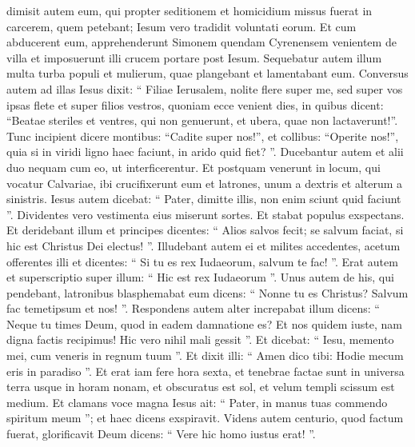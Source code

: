 \begin{biblechapter}
\begin{biblechapter}
\begin{biblechapter}
\begin{biblechapter}
\begin{biblechapter}
\begin{biblechapter}
\begin{biblechapter}
\begin{biblechapter}
\begin{biblechapter}
\begin{biblechapter}
\begin{biblechapter}
\begin{biblechapter}
\begin{biblechapter}
\begin{biblechapter}
\begin{biblechapter}
\begin{biblechapter}
\begin{biblechapter}
\begin{biblechapter}
\begin{biblechapter}
\begin{biblechapter}
\begin{biblechapter}
\begin{biblechapter}
\begin{biblechapter}
\verse dimisit autem eum, qui propter seditionem et homicidium missus fuerat in carcerem, quem petebant; Iesum vero tradidit voluntati eorum.
 \verse Et cum abducerent eum, apprehenderunt Simonem quendam Cyrenensem venientem de villa et imposuerunt illi crucem portare post Iesum.
 \verse Sequebatur autem illum multa turba populi et mulierum, quae plangebant et lamentabant eum. 
\verse Conversus autem ad illas Iesus dixit: “ Filiae Ierusalem, nolite flere super me, sed super vos ipsas flete et super filios vestros, 
\verse quoniam ecce venient dies, in quibus dicent: “Beatae steriles et ventres, qui non genuerunt, et ubera, quae non lactaverunt!”.
 \verse Tunc incipient dicere montibus: “Cadite super nos!”, et collibus: “Operite nos!”, 
\verse quia si in viridi ligno haec faciunt, in arido quid fiet? ”.
 \verse Ducebantur autem et alii duo nequam cum eo, ut interficerentur.
 \verse Et postquam venerunt in locum, qui vocatur Calvariae, ibi crucifixerunt eum et latrones, unum a dextris et alterum a sinistris. 
\verse Iesus autem dicebat: “ Pater, dimitte illis, non enim sciunt quid faciunt ”.
 Dividentes vero vestimenta eius miserunt sortes. 
\verse Et stabat populus exspectans. Et deridebant illum et principes dicentes: “ Alios salvos fecit; se salvum faciat, si hic est Christus Dei electus! ”. 
\verse Illudebant autem ei et milites accedentes, acetum offerentes illi 
\verse et dicentes: “ Si tu es rex Iudaeorum, salvum te fac! ”. 
\verse Erat autem et superscriptio super illum: “ Hic est rex Iudaeorum ”.
 \verse Unus autem de his, qui pendebant, latronibus blasphemabat eum dicens: “ Nonne tu es Christus? Salvum fac temetipsum et nos! ”. 
\verse Respondens autem alter increpabat illum dicens: “ Neque tu times Deum, quod in eadem damnatione es? 
 \verse Et nos quidem iuste, nam digna factis recipimus! Hic vero nihil mali gessit ”. 
\verse Et dicebat: “ Iesu, memento mei, cum veneris in regnum tuum ”. 
\verse Et dixit illi: “ Amen dico tibi: Hodie mecum eris in paradiso ”.
 \verse Et erat iam fere hora sexta, et tenebrae factae sunt in universa terra usque in horam nonam, 
\verse et obscuratus est sol, et velum templi scissum est medium. 
\verse Et clamans voce magna Iesus ait: “ Pater, in manus tuas commendo spiritum meum ”; et haec dicens exspiravit.
 \verse Videns autem centurio, quod factum fuerat, glorificavit Deum dicens: “ Vere hic homo iustus erat! ”. 

\end{biblechapter}
\end{biblechapter}
\end{biblechapter}
\end{biblechapter}
\end{biblechapter}
\end{biblechapter}
\end{biblechapter}
\end{biblechapter}
\end{biblechapter}
\end{biblechapter}
\end{biblechapter}
\end{biblechapter}
\end{biblechapter}
\end{biblechapter}
\end{biblechapter}
\end{biblechapter}
\end{biblechapter}
\end{biblechapter}
\end{biblechapter}
\end{biblechapter}
\end{biblechapter}
\end{biblechapter}
\end{biblechapter}

